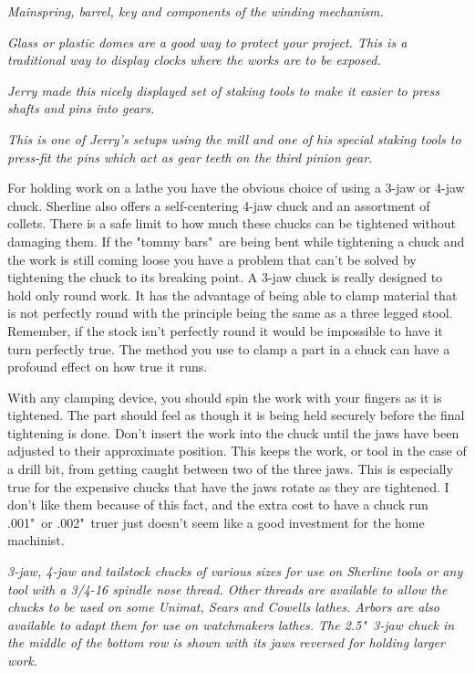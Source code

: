 \bigskip
\textit{Mainspring, barrel, key and components of the winding mechanism.}
\bigskip

\textit{Glass or plastic domes are a good way to protect your project. This is a
traditional way to display clocks where the works are to be exposed.}
\bigskip

\textit{Jerry made this nicely displayed set of staking tools to make it easier
to press shafts and pins into gears.}
\bigskip

\textit{This is one of Jerry's setups using the mill and one of his special
staking tools to press-fit the pins which act as gear teeth on the third pinion
gear.}
\bigskip

\secdown

\secdown

For holding work on a lathe you have the obvious choice of using a 3-jaw or
4-jaw chuck. Sherline also offers a self-centering 4-jaw chuck and an assortment
of collets. There is a safe limit to how much these chucks can be tightened
without damaging them. If the "tommy bars"\ are being bent while tightening a
chuck and the work is still coming loose you have a problem that can't be solved
by tightening the chuck to its breaking point. A 3-jaw chuck is really designed
to hold only round work. It has the advantage of being able to clamp material
that is not perfectly round with the principle being the same as a three legged
stool. Remember, if the stock isn't perfectly round it would be impossible to
have it turn perfectly true. The method you use to clamp a part in a chuck can
have a profound effect on how true it runs.


With any clamping device, you should spin the work with your fingers as it is
tightened. The part should feel as though it is being held securely before the
final tightening is done. Don't insert the work into the chuck until the jaws
have been adjusted to their approximate position. This keeps the work, or tool
in the case of a drill bit, from getting caught between two of the three jaws.
This is especially true for the expensive chucks that have the jaws rotate as
they are tightened. I don't like them because of this fact, and the extra cost
to have a chuck run .001"\ or .002"\ truer just doesn't seem like a good
investment for the home machinist.

\bigskip
\textit{3-jaw, 4-jaw and tailstock chucks of various sizes for use on Sherline
tools or any tool with a 3/4-16 spindle nose thread. Other threads are available
to allow the chucks to be used on some Unimat, Sears and Cowells lathes. Arbors
are also available to adapt them for use on watchmakers lathes. The 2.5"\ 3-jaw
chuck in the middle of the bottom row is shown with its jaws reversed for
holding larger work.}
\bigskip

